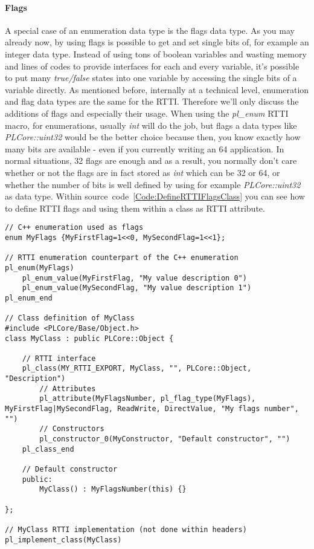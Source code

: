 \paragraph{Flags}
A special case of an enumeration data type is the flags data type. As you may already now, by using flags is possible to get and set single bits of, for example an integer data type. Instead of using tons of boolean variables and wasting memory and lines of codes to provide interfaces for each and every variable, it's possible to put many \emph{true/false} states into one variable by accessing the single bits of a variable directly. As mentioned before, internally at a technical level, enumeration and flag data types are the same for the \ac{RTTI}. Therefore we'll only discuss the additions of flags and especially their usage. When using the \emph{pl\_enum} \ac{RTTI} macro, for enumerations, usually \emph{int} will do the job, but flags a data types like \emph{PLCore::uint32} would be the better choice because then, you know exactly how many bits are available - even if you currently writing an \SI{64}{\bit} application. In normal situations, 32 flags are enough and as a result, you normally don't care whether or not the flags are in fact stored as \emph{int} which can be \SI{32}{\bit} or \SI{64}{\bit}, or whether the number of bits is well defined by using for example \emph{PLCore::uint32} as data type. Within source~code~\ref{Code:DefineRTTIFlagsClass} you can see how to define \ac{RTTI} flags and using them within a class as \ac{RTTI} attribute.
\begin{lstlisting}[label=Code:DefineRTTIFlagsClass,caption={Defining new \ac{RTTI} flags and a \ac{RTTI} class using them}]
// C++ enumeration used as flags
enum MyFlags {MyFirstFlag=1<<0, MySecondFlag=1<<1};

// RTTI enumeration counterpart of the C++ enumeration
pl_enum(MyFlags)
	pl_enum_value(MyFirstFlag, "My value description 0")
	pl_enum_value(MySecondFlag, "My value description 1")
pl_enum_end

// Class definition of MyClass
#include <PLCore/Base/Object.h>
class MyClass : public PLCore::Object {

	// RTTI interface
	pl_class(MY_RTTI_EXPORT, MyClass, "", PLCore::Object, "Description")
		// Attributes
		pl_attribute(MyFlagsNumber, pl_flag_type(MyFlags), MyFirstFlag|MySecondFlag, ReadWrite, DirectValue, "My flags number", "")
		// Constructors
		pl_constructor_0(MyConstructor, "Default constructor", "")
	pl_class_end

	// Default constructor
	public:
		MyClass() : MyFlagsNumber(this) {}

};

// MyClass RTTI implementation (not done within headers)
pl_implement_class(MyClass)
\end{lstlisting}
